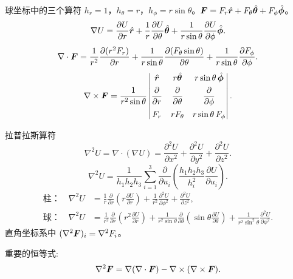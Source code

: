 \begin{frame}{球坐标中的三个算符}
$h_r=1$，$h_\theta=r$，$h_\phi=r\sin\theta$。$\bm{F}=F_r\hat{\bm{r}}+F_\theta\hat{\bm{\theta}}+F_\phi\hat{\bm{\phi}}$。
\[
\nabla U=\frac{\partial U}{\partial r}\hat{\bm{r}}+\frac{1}{r}\frac{\partial U}{\partial\theta}\hat{\bm{\theta}}+\frac{1}{r\sin\theta}\frac{\partial U}{\partial\phi}\hat{\bm{\phi}}.
\]
\[
\nabla\cdot\bm{F}=\frac{1}{r^2}\frac{\partial(r^2 F_r)}{\partial r}+\frac{1}{r\sin\theta}\frac{\partial(F_\theta\sin\theta)}{\partial\theta}+\frac{1}{r\sin\theta}\frac{\partial F_\phi}{\partial\phi}.
\]
\[
\nabla\times\bm{F}=\frac{1}{r^2\sin\theta}
\begin{vmatrix}
\hat{\bm{r}}&r\hat{\bm{\theta}}&r\sin\theta\,\hat{\bm{\phi}}\\[4pt]
\dfrac{\partial}{\partial r}&\dfrac{\partial}{\partial\theta}&\dfrac{\partial}{\partial\phi}\\[10pt]
F_r&r F_\theta&r\sin\theta\,F_\phi
\end{vmatrix}.
\]
\end{frame}

\begin{frame}{拉普拉斯算符}
\[
\nabla^2 U=\nabla\cdot(\nabla U)
=\frac{\partial^2 U}{\partial x^2}+\frac{\partial^2 U}{\partial y^2}+\frac{\partial^2 U}{\partial z^2}.
\]
\[
\nabla^2 U=\frac{1}{h_1 h_2 h_3}\sum_{i=1}^{3}
\frac{\partial}{\partial u_i}\!\left(\frac{h_1 h_2 h_3}{h_i^2}\frac{\partial U}{\partial u_i}\right).
\]
\[
\begin{aligned}
\text{柱：}\quad
\nabla^2 U
&=\frac1r\frac{\partial}{\partial r}\!\left(r\frac{\partial U}{\partial r}\right)
+\frac{1}{r^2}\frac{\partial^2 U}{\partial\phi^2}
+\frac{\partial^2 U}{\partial z^2},\\[4pt]
\text{球：}\quad
\nabla^2 U
&=\frac{1}{r^2}\frac{\partial}{\partial r}\!\left(r^2\frac{\partial U}{\partial r}\right)
+\frac{1}{r^2\sin\theta}\frac{\partial}{\partial\theta}\!\left(\sin\theta\frac{\partial U}{\partial\theta}\right)
+\frac{1}{r^2\sin^2\theta}\frac{\partial^2 U}{\partial\phi^2}.
\end{aligned}
\]
直角坐标系中 $(\nabla^2\bm{F})_i=\nabla^2 F_i$。

重要的恒等式:   
\[
\nabla^2\bm{F}=\nabla(\nabla\cdot\bm{F})-\nabla\times(\nabla\times\bm{F}).
\]
\end{frame}
